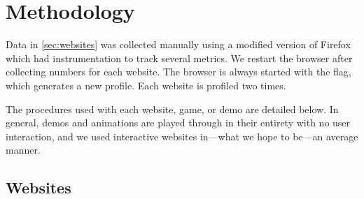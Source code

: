 \appendix

\section{Methodology}
\label{app:methodology}

Data in \Section\ref{sec:websites} was collected manually using a modified
version of Firefox which had instrumentation to track several metrics. We
restart the browser after collecting numbers for each website. The browser is
always started with the  flag, which generates a new
profile. Each website is profiled two times.

The procedures used with each website, game, or demo are detailed below. In
general, demos and animations are played through in their entirety with no
user interaction, and we used interactive websites in---what we hope to
be---an average manner.

\subsection{Websites}


